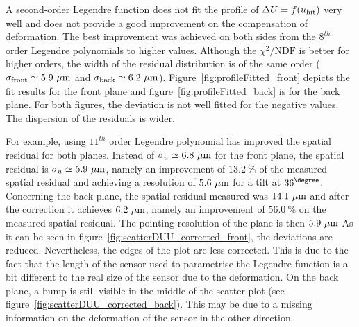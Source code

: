       A second-order Legendre function does not fit the profile of $\Delta U=f(u_{\rm{hit}})$ very well and does not provide a good improvement on the compensation of deformation.
      The best improvement was achieved on both sides from the $8^{th}$ order Legendre polynomials to higher values.
      Although the $\chi^2 \text{/NDF}$ is better for higher orders, the width of the residual distribution is of the same order ($\sigma_{\rm{front}}\simeq 5.9~\rm{\mu m}$ and $\sigma_{\rm{back}} \simeq 6.2~\rm{\mu m}$).
      Figure~\ref{fig:profileFitted_front} depicts the fit results for the front plane and figure~\ref{fig:profileFitted_back} is for the back plane.
      For both figures, the deviation is not well fitted for the negative values.
      The dispersion of the residuals is wider. 

      For example, using $11^{th}$ order Legendre polynomial has improved the spatial residual for both planes. 
      Instead of $\sigma_{u} \simeq 6.8~\rm{\mu m}$ for the front plane, the spatial residual is $\sigma_{u} \simeq 5.9~\rm{\mu m}$, namely an improvement of $13.2~\%$ of the measured spatial residual and achieving a resolution of $5.6~\rm{\mu m}$ for a tilt at $36^{\degree}$.
      Concerning the back plane, the spatial residual measured was $14.1~\rm{\mu m}$ and after the correction it achieves $6.2~\rm{\mu m}$, namely an improvement of $56.0~\%$ on the measured spatial residual.
      The pointing resolution of the plane is then $5.9~\rm{\mu m}$
      As it can be seen in figure~\ref{fig:scatterDUU_corrected_front}, the deviations are reduced. 
      Nevertheless, the edges of the plot are less corrected.
      This is due to the fact that the length of the sensor used to parametrise the Legendre function is a bit different to the real size of the sensor due to the deformation.
      On the back plane, a bump is still visible in the middle of the scatter plot (see figure~\ref{fig:scatterDUU_corrected_back}).
      This may be due to a missing information on the deformation of the sensor in the other direction.

